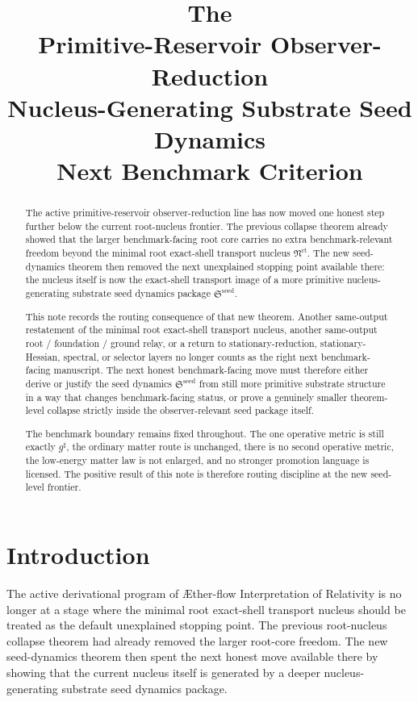 \documentclass[11pt]{article}
\title{\textbf{The \TheoryName{}}\\[0.4em]
\large Primitive-Reservoir Observer-Reduction\\
\large Nucleus-Generating Substrate Seed Dynamics\\
\large Next Benchmark Criterion}
\author{}
\date{}
\newcommand{\Aflow}{\AE{}ther-flow}
\newcommand{\TheoryName}{\Aflow{} Interpretation of Relativity}
\newcommand{\CompletedMetric}{g^{\sharp}}
\newcommand{\RootNucleus}{\mathfrak N^{\mathrm{rt}}}
\newcommand{\SeedPackage}{\mathfrak S^{\mathrm{seed}}}
\begin{document}
\maketitle

\begin{abstract}
The active primitive-reservoir observer-reduction line has now moved one honest step further below the current root-nucleus frontier. The previous collapse theorem already showed that the larger benchmark-facing root core carries no extra benchmark-relevant freedom beyond the minimal root exact-shell transport nucleus \(\RootNucleus\). The new seed-dynamics theorem then removed the next unexplained stopping point available there: the nucleus itself is now the exact-shell transport image of a more primitive nucleus-generating substrate seed dynamics package \(\SeedPackage\).

This note records the routing consequence of that new theorem. Another same-output restatement of the minimal root exact-shell transport nucleus, another same-output root / foundation / ground relay, or a return to stationary-reduction, stationary-Hessian, spectral, or selector layers no longer counts as the right next benchmark-facing manuscript. The next honest benchmark-facing move must therefore either derive or justify the seed dynamics \(\SeedPackage\) from still more primitive substrate structure in a way that changes benchmark-facing status, or prove a genuinely smaller theorem-level collapse strictly inside the observer-relevant seed package itself.

The benchmark boundary remains fixed throughout. The one operative metric is still exactly \(\CompletedMetric\), the ordinary matter route is unchanged, there is no second operative metric, the low-energy matter law is not enlarged, and no stronger promotion language is licensed. The positive result of this note is therefore routing discipline at the new seed-level frontier.
\end{abstract}

\section{Introduction}

The active derivational program of \TheoryName{} is no longer at a stage where the minimal root exact-shell transport nucleus should be treated as the default unexplained stopping point. The previous root-nucleus collapse theorem had already removed the larger root-core freedom. The new seed-dynamics theorem then spent the next honest move available there by showing that the current nucleus itself is generated by a deeper nucleus-generating substrate seed dynamics package.
\end{document}
